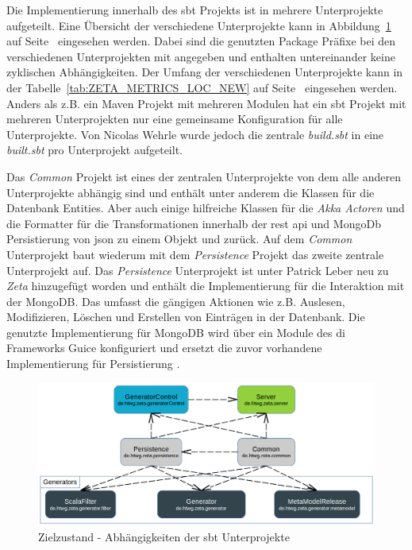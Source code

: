 Die Implementierung innerhalb des \ac{sbt} Projekts ist in mehrere Unterprojekte aufgeteilt. Eine Übersicht der verschiedene Unterprojekte kann in Abbildung~\ref{fig:ZETA_SBT_NEW} auf Seite~\pageref{fig:ZETA_SBT_NEW} eingesehen werden. Dabei sind die genutzten Package Präfixe bei den verschiedenen Unterprojekten mit angegeben und enthalten untereinander keine zyklischen Abhängigkeiten. Der Umfang der verschiedenen Unterprojekte kann in der Tabelle~\ref{tab:ZETA_METRICS_LOC_NEW} auf Seite~\pageref{tab:ZETA_METRICS_LOC_NEW} eingesehen werden. Anders als z.B. ein Maven Projekt mit mehreren Modulen hat ein \ac{sbt} Projekt mit mehreren Unterprojekten nur eine gemeinsame Konfiguration für alle Unterprojekte. Von Nicolas Wehrle wurde jedoch die zentrale \textit{build.sbt} in eine \textit{built.sbt} pro Unterprojekt aufgeteilt.

Das \textit{Common} Projekt ist eines der zentralen Unterprojekte von dem alle anderen Unterprojekte abhängig sind und enthält unter anderem die Klassen für die Datenbank Entities. Aber auch einige hilfreiche Klassen für die \textit{Akka Actoren} und die Formatter für die Transformationen innerhalb der \ac{rest} \ac{api} und MongoDb Persistierung von \ac{json} zu einem Objekt und zurück. Auf dem \textit{Common} Unterprojekt baut wiederum mit dem \textit{Persistence} Projekt das zweite zentrale Unterprojekt auf. Das \textit{Persistence} Unterprojekt ist unter Patrick Leber neu zu \textit{Zeta} hinzugefügt worden und enthält die Implementierung für die Interaktion mit der MongoDB. Das umfasst die gängigen Aktionen wie z.B. Auslesen, Modifizieren, Löschen und Erstellen von Einträgen in der Datenbank. Die genutzte Implementierung für MongoDB wird über ein Module des \ac{di} Frameworks Guice konfiguriert und ersetzt die zuvor vorhandene Implementierung für Persistierung \cite{zeta_new_persistence_module}.

\begin{figure}
    \centering
    \includegraphics[width=5in]{figures/sbt-modules-final.png}
    \caption{Zielzustand - Abhängigkeiten der \ac{sbt} Unterprojekte}
    \label{fig:ZETA_SBT_NEW}
\end{figure}

